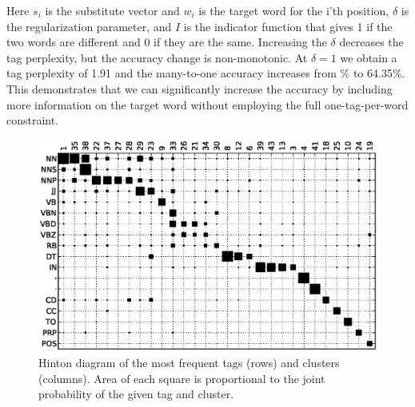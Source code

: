 Here $s_i$ is the substitute vector and $w_i$ is the target word for
the i'th position, $\delta$ is the regularization parameter, and $I$
is the indicator function that gives 1 if the two words are different
and 0 if they are the same.  Increasing the $\delta$ decreases the tag
perplexity, but the accuracy change is non-monotonic.  At $\delta=1$
we obtain a tag perplexity of 1.91 and the many-to-one accuracy
increases from \spectralResult\% to 64.35\%.  This demonstrates that
we can significantly increase the accuracy by including more
information on the target word without employing the full
one-tag-per-word constraint.  



\begin{figure}[t]
\includegraphics[width=\textwidth]{hinton.eps}
\vspace*{-10mm}
\caption{Hinton diagram of the most frequent tags (rows) and clusters
  (columns).  Area of each square is proportional to the joint
  probability of the given tag and cluster.}
\label{fig:hinton}
\end{figure}
